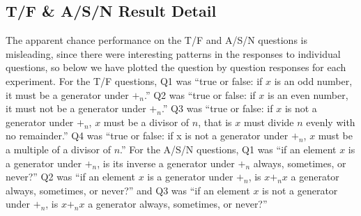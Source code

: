 \documentclass[man,mask,10pt]{apa6}
\begin{document}
\subsection{T/F \& A/S/N Result Detail}
The apparent chance performance on the T/F and A/S/N questions is misleading, since there were interesting patterns in the responses to individual questions, so below we have plotted the question by question responses for each experiment. For the T/F questions, Q1 was ``true or false: if $x$ is an odd number, it must be a generator under $+_n$.'' Q2 was ``true or false: if $x$ is an even number, it must not be a generator under $+_n$.'' Q3 was ``true or false: if $x$ is not a generator under $+_n$, $x$ must be a divisor of $n$, that is $x$ must divide $n$ evenly with no remainder.'' Q4 was ``true or false: if x is not a generator under $+_n$, $x$ must be a multiple of a divisor of $n$.'' For the A/S/N questions, Q1 was ``if an element $x$ is a generator under $+_n$, is its inverse a generator under $+_n$ always, sometimes, or never?'' Q2 was ``if an element $x$ is a generator under $+_n$, is $x+_nx$ a generator always, sometimes, or never?'' and Q3 was ``if an element $x$ is not a generator under $+_n$, is $x +_n x$ a generator always, sometimes, or never?''
\end{document}
